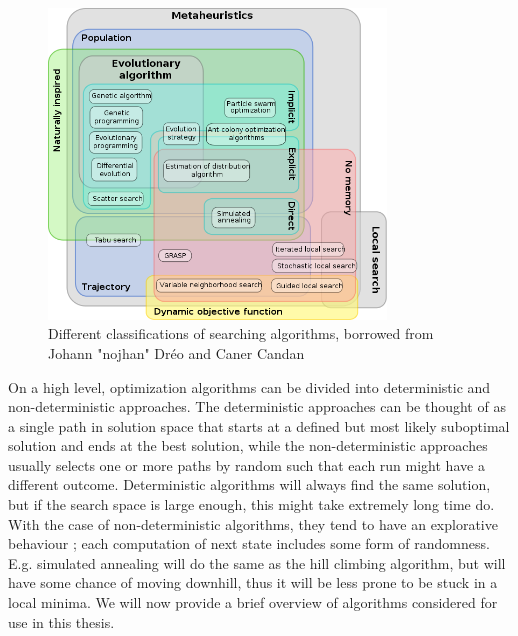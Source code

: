 \begin{figure}
    \centering
    \includegraphics[width=0.8\textwidth]{figs/630px-Metaheuristics_classification.png}
    \caption{Different classifications of searching algorithms, borrowed from Johann "nojhan" Dréo and Caner Candan \cite{wikimetaheuristics}}
    \label{fig:metaheuristics}
\end{figure}

On a high level, optimization algorithms can be divided into deterministic and
non-deterministic approaches. The deterministic approaches can be thought of as
a single path in solution space that starts at a defined but most likely
suboptimal solution and ends at the best solution, while the non-deterministic
approaches usually selects one or more paths by random such that each run might
have a different outcome. Deterministic algorithms will always find the same
solution, but if the search space is large enough, this might take extremely
long time do.  With the case of non-deterministic algorithms, they tend to have
an explorative behaviour \cite{poli2008field}; each computation of next state
includes some form of randomness. E.g. simulated annealing will do the same as
the hill climbing algorithm, but will have some chance of moving downhill, thus
it will be less prone to be stuck in a local minima. We will now provide a brief
overview of algorithms considered for use in this thesis.


